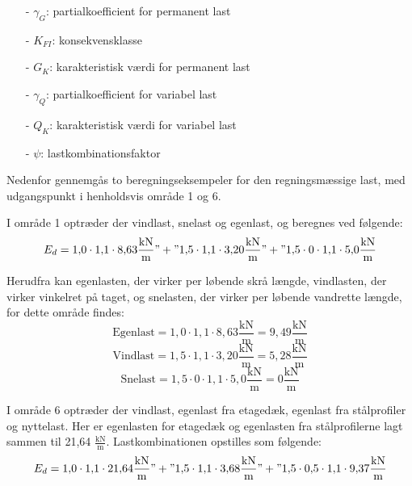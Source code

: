 \begin{itemize}
	\item[-] $\gamma_G$: partialkoefficient for permanent last
	\item[-] $K_{FI}$: konsekvensklasse
	\item[-] $G_K$: karakteristisk værdi for permanent last
	\item[-] $\gamma_Q$: partialkoefficient for variabel last
	\item[-] $Q_K$: karakteristisk værdi for variabel last
	\item[-] $\psi$: lastkombinationsfaktor 
\end{itemize}

Nedenfor gennemgås to beregningseksempeler for den regningsmæssige last, med udgangspunkt i henholdsvis område 1 og 6. 

I område 1 optræder der vindlast, snelast og egenlast, og beregnes ved følgende:
\begin{equation}
	E_d = 1,\!0 \cdot 1,\!1 \cdot 8,\!63 \frac{\text{kN}}{\text{m}}" + "1,\!5 \cdot 1,\!1 \cdot 3,\!20 \frac{\text{kN}}{\text{m}}" + "1,\!5 \cdot 0 \cdot 1,\!1 \cdot 5,\!0 \frac{\text{kN}}{\text{m}}
\end{equation}

Herudfra kan egenlasten, der virker per løbende skrå længde, vindlasten, der virker vinkelret på taget, og snelasten, der virker per løbende vandrette længde, for dette område findes:
\begin{equation}
	\text{Egenlast} = 1,\!0 \cdot 1,\!1 \cdot 8,\!63 \frac{\text{kN}}{\text{m}} = 9,\!49 \frac{\text{kN}}{\text{m}}
\end{equation}
\begin{equation}
	\text{Vindlast} = 1,\!5 \cdot 1,\!1 \cdot 3,\!20 \frac{\text{kN}}{\text{m}} = 5,\!28 \frac{\text{kN}}{\text{m}}
\end{equation}
\begin{equation}
	\text{Snelast} = 1,\!5 \cdot 0 \cdot 1,\!1 \cdot 5,\!0 \frac{\text{kN}}{\text{m}} = 0 \frac{\text{kN}}{\text{m}}
\end{equation}

I område 6 optræder der vindlast, egenlast fra etagedæk, egenlast fra stålprofiler og nyttelast. Her er egenlasten for etagedæk og egenlasten fra stålprofilerne lagt sammen til 21,64 $\frac{\text{kN}}{\text{m}}$. Lastkombinationen opstilles som følgende:
\begin{equation}
	E_d = 1,\!0 \cdot 1,\!1 \cdot 21,\!64 \frac{\text{kN}}{\text{m}}" + "1,\!5 \cdot 1,\!1 \cdot 3,\!68 \frac{\text{kN}}{\text{m}}" + "1,\!5 \cdot 0,\!5 \cdot 1,\!1 \cdot 9,\!37 \frac{\text{kN}}{\text{m}}
\end{equation}

